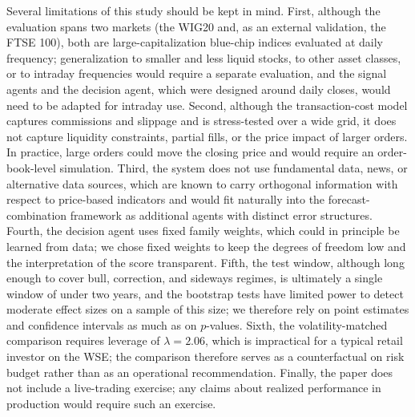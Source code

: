 \documentclass{ieeeaccess}
\newcommand{\Leverage}{\ensuremath{2.06}}
\begin{document}
Several limitations of this study should be kept in mind. First, although the evaluation spans two markets (the WIG20 and, as an external validation, the FTSE 100), both are large-capitalization blue-chip indices evaluated at daily frequency; generalization to smaller and less liquid stocks, to other asset classes, or to intraday frequencies would require a separate evaluation, and the signal agents and the decision agent, which were designed around daily closes, would need to be adapted for intraday use. Second, although the transaction-cost model captures commissions and slippage and is stress-tested over a wide grid, it does not capture liquidity constraints, partial fills, or the price impact of larger orders. In practice, large orders could move the closing price and would require an order-book-level simulation. Third, the system does not use fundamental data, news, or alternative data sources, which are known to carry orthogonal information with respect to price-based indicators and would fit naturally into the forecast-combination framework as additional agents with distinct error structures. Fourth, the decision agent uses fixed family weights, which could in principle be learned from data; we chose fixed weights to keep the degrees of freedom low and the interpretation of the score transparent. Fifth, the test window, although long enough to cover bull, correction, and sideways regimes, is ultimately a single window of under two years, and the bootstrap tests have limited power to detect moderate effect sizes on a sample of this size; we therefore rely on point estimates and confidence intervals as much as on $p$-values. Sixth, the volatility-matched comparison requires leverage of $\lambda = \Leverage{}$, which is impractical for a typical retail investor on the WSE; the comparison therefore serves as a counterfactual on risk budget rather than as an operational recommendation. Finally, the paper does not include a live-trading exercise; any claims about realized performance in production would require such an exercise.
\end{document}
